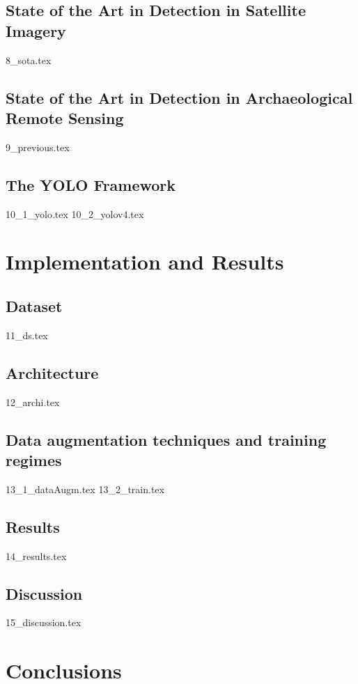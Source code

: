 \documentclass[a4paper, 12pt, titlepage, oneside]{report}
\begin{document}
\chapter[State of the Art]{State of the Art in Detection in Satellite Imagery}
{8_sota.tex}
\newpage

\chapter[State of the Art]{State of the Art in Detection in Archaeological Remote Sensing}
{9_previous.tex}
\newpage

\chapter{The YOLO Framework}
{10_1_yolo.tex}
{10_2_yolov4.tex}\label{yolov4}
\newpage

\part{Implementation and Results}
\chapter{Dataset}
{11_ds.tex}
\newpage

\chapter{Architecture}
{12_archi.tex}
\newpage

\chapter[Training]{Data augmentation techniques and training regimes}\label{train}
{13_1_dataAugm.tex}
{13_2_train.tex}
\newpage

\chapter{Results}
{14_results.tex}
\newpage

\chapter{Discussion}
{15_discussion.tex}
\newpage

\part{Conclusions}
\end{document}
